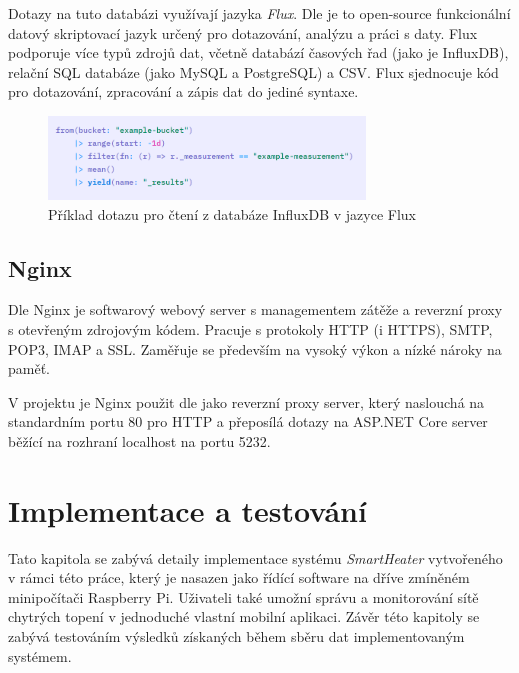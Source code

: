 Dotazy na tuto databázi využívají jazyka {\it Flux}. Dle \cite{flux} je to open-source funkcionální datový skriptovací jazyk určený pro dotazování, analýzu a práci s daty. Flux podporuje více typů zdrojů dat, včetně databází časových řad (jako je InfluxDB), relační SQL databáze (jako MySQL a PostgreSQL) a CSV. Flux sjednocuje kód pro dotazování, zpracování a zápis dat do jediné syntaxe.

\begin{figure}[hbt]
\centering
\includegraphics[width=0.75\textwidth]{obrazky-figures/flux-example.png}
\caption{Příklad dotazu pro čtení z databáze InfluxDB v jazyce Flux \cite{flux_gs}}
\end{figure}

\section{Nginx}
Dle \cite{nginx_wiki} Nginx je softwarový webový server s managementem zátěže a reverzní proxy s otevřeným zdrojovým kódem. Pracuje s protokoly HTTP (i HTTPS), SMTP, POP3, IMAP a SSL. Zaměřuje se především na vysoký výkon a nízké nároky na paměť.

V projektu je Nginx použit dle \cite{nginx_asp} jako reverzní proxy server, který naslouchá na standardním portu 80 pro HTTP a přeposílá dotazy na ASP.NET Core server běžící na rozhraní localhost na portu 5232.

\chapter{Implementace a testování}
\label{implementace}

Tato kapitola se zabývá detaily implementace systému {\it SmartHeater} vytvořeného v rámci této práce, který je nasazen jako řídící software na dříve zmíněném minipočítači Raspberry Pi. Uživateli také umožní správu a monitorování sítě chytrých topení v jednoduché vlastní mobilní aplikaci. Závěr této kapitoly se zabývá testováním výsledků získaných během sběru dat implementovaným systémem.

